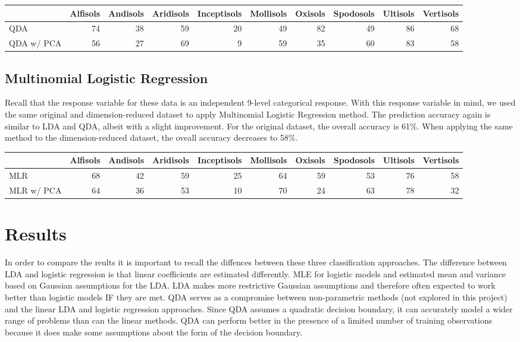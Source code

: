 \documentclass[]{article}
\begin{document}
\begin{longtable}[]{@{}lrrrrrrrrr@{}}
\toprule
& Alfisols & Andisols & Aridisols & Inceptisols & Mollisols & Oxisols &
Spodosols & Ultisols & Vertisols\tabularnewline
\midrule
\endhead
QDA & 74 & 38 & 59 & 20 & 49 & 82 & 49 & 86 & 68\tabularnewline
QDA w/ PCA & 56 & 27 & 69 & 9 & 59 & 35 & 60 & 83 & 58\tabularnewline
\bottomrule
\end{longtable}

\subsection{Multinomial Logistic
Regression}\label{multinomial-logistic-regression}

Recall that the response variable for these data is an independent
9-level categorical response. With this response variable in mind, we
used the same original and dimension-reduced dataset to apply
Multinomial Logistic Regression method. The prediction accuracy again is
similar to LDA and QDA, albeit with a slight improvement. For the
original dataset, the overall accuracy is 61\%. When applying the same
method to the dimension-reduced dataset, the oveall accuracy decreases
to 58\%.

\begin{longtable}[]{@{}lrrrrrrrrr@{}}
\toprule
& Alfisols & Andisols & Aridisols & Inceptisols & Mollisols & Oxisols &
Spodosols & Ultisols & Vertisols\tabularnewline
\midrule
\endhead
MLR & 68 & 42 & 59 & 25 & 64 & 59 & 53 & 76 & 58\tabularnewline
MLR w/ PCA & 64 & 36 & 53 & 10 & 70 & 24 & 63 & 78 & 32\tabularnewline
\bottomrule
\end{longtable}

\section{Results}\label{results}

In order to compare the reults it is important to recall the diffences
between these three classification approaches. The difference between
LDA and logistic regression is that linear coefficients are estimated
differently. MLE for logistic models and estimated mean and variance
based on Gaussian assumptions for the LDA. LDA makes more restrictive
Gaussian assumptions and therefore often expected to work better than
logistic models IF they are met. QDA serves as a compromise between
non-parametric methods (not explored in this project) and the linear LDA
and logistic regression approaches. Since QDA assumes a quadratic
decision boundary, it can accurately model a wider range of problems
than can the linear methods. QDA can perform better in the presence of a
limited number of training observations because it does make some
assumptions about the form of the decision boundary.
\end{document}

